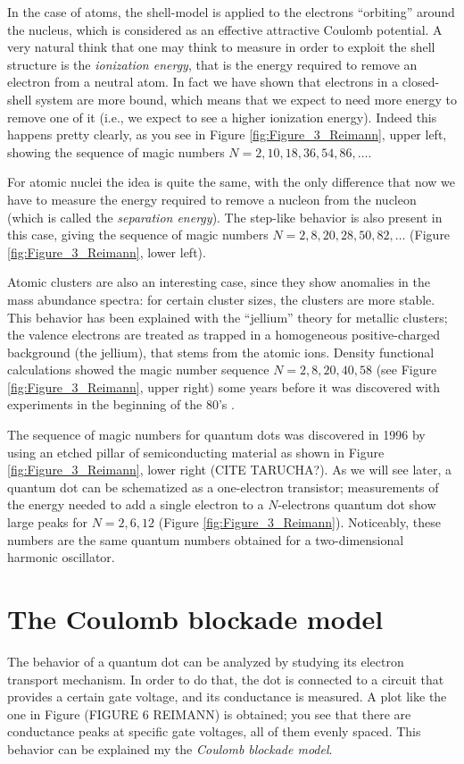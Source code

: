 \documentclass[a4paper,twoside,11pt]{book}
\begin{document}
In the case of atoms, the shell-model is applied to the electrons ``orbiting'' around the nucleus, which is considered as an effective attractive Coulomb potential. A very natural think that one may think to measure in order to exploit the shell structure is the \emph{ionization energy}, that is the energy required to remove an electron from a neutral atom. In fact we have shown that electrons in a closed-shell system are more bound, which means that we expect to need more energy to remove one of it (i.e., we expect to see a higher ionization energy). Indeed this happens pretty clearly, as you see in Figure \ref{fig:Figure_3_Reimann}, upper left, showing the sequence of magic numbers $N=2,10,18,36,54,86,\ldots$.

For atomic nuclei the idea is quite the same, with the only difference that now we have to measure the energy required to remove a nucleon from the nucleon (which is called the \emph{separation energy}). The step-like behavior is also present in this case, giving the sequence of magic numbers $N=2,8,20,28,50,82,\ldots$ (Figure \ref{fig:Figure_3_Reimann}, lower left).

Atomic clusters are also an interesting case, since they show anomalies in the mass abundance spectra: for certain cluster sizes, the clusters are more stable. This behavior has been explained with the ``jellium'' theory for metallic clusters; the valence electrons are treated as trapped in a homogeneous positive-charged background (the jellium), that stems from the atomic ions. Density functional calculations showed the magic number sequence $N=2,8,20,40,58$ (see Figure \ref{fig:Figure_3_Reimann}, upper right) some years before it was discovered with experiments in the beginning of the 80's \citep[see][]{Reimann2002}.

The sequence of magic numbers for quantum dots was discovered in 1996 by using an etched pillar of semiconducting material as shown in Figure \ref{fig:Figure_3_Reimann}, lower right (CITE TARUCHA?). As we will see later, a quantum dot can be schematized as a one-electron transistor; measurements of the energy needed to add a single electron to a $N$-electrons quantum dot show large peaks for $N=2,6,12$ (Figure \ref{fig:Figure_3_Reimann}). Noticeably, these numbers are the same quantum numbers obtained for a two-dimensional harmonic oscillator.

\section{The Coulomb blockade model}
The behavior of a quantum dot can be analyzed by studying its electron transport mechanism. In order to do that, the dot is connected to a circuit that provides a certain gate voltage, and its conductance is measured. A plot like the one in Figure (FIGURE 6 REIMANN) is obtained; you see that there are conductance peaks at specific gate voltages, all of them evenly spaced. This behavior can be explained my the \emph{Coulomb blockade model}.
\end{document}

